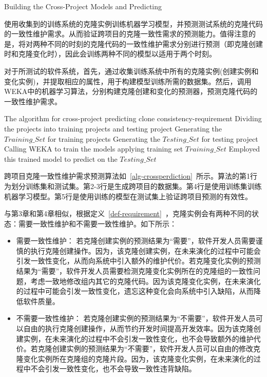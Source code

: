 {Building the Cross-Project Models and Predicting}

使用收集到的训练系统的克隆实例训练机器学习模型，并预测测试系统的克隆代码的一致性维护需求。从而验证跨项目的克隆一致性需求的预测能力。值得注意的是，将对两种不同的时刻的克隆代码的一致性维护需求分别进行预测（即克隆创建时和克隆变化时），因此会训练两种不同的模型以适用于两个时刻。

对于所测试的软件系统，首先，通过收集训练系统中所有的克隆实例(创建实例和变化实例)，并提取相应的属性，用于构建模型训练所需的数据集。然后，调用WEKA中的机器学习算法，分别构建克隆创建和变化的预测器，预测克隆代码的一致性维护需求。

\vspace{1em}
\begin{minipage}{0.8\textwidth}
\centering
\begin{algorithm}[H]
 {The algorithm for cross-project predicting clone consistency-requirement}
\label{alg-crossperdiction}
Dividing the projects into training projects and testing project\;
Generating the $Training\_{Set}$ for training projects\;
Generating the $Testing\_{Set}$ for testing project\;
Calling WEKA to train the models applying training set $Training\_{Set}$\;
Employed this trained model to predict on the $Testing\_{Set}$\;
\end{algorithm}
\end{minipage}
\vspace{1em}

跨项目克隆一致性维护需求预测算法如~\ref{alg-crossperdiction}~所示。算法的第1行为划分训练集和测试集。第2-3行是生成跨项目的数据集。第4行是使用训练集训练机器学习模型。第5行是使用训练的模型在测试集上验证跨项目预测的有效性。

与第3章和第4章相似，根据定义~\ref{def-requirement}~，克隆实例会有两种不同的状态：需要一致性维护和不需要一致性维护。如下所示：

\begin{itemize}
\item 
需要一致性维护：
若克隆创建实例的预测结果为“需要”，软件开发人员需要谨慎的执行克隆创建操作。因为，该克隆创建实例，在未来演化的过程中可能会引发一致性变化，从而向系统中引入额外的维护代价。若克隆变化实例的预测结果为“需要”，软件开发人员需要检测克隆变化实例所在的克隆组的一致性问题，考虑一致地修改组内其它的克隆代码。因为该克隆变化实例，在未来演化的过程中可能会引发一致性变化，遗忘这种变化会向系统中引入缺陷，从而降低软件质量。
\item
不需要一致性维护：
若克隆创建实例的预测结果为“不需要”，软件开发人员可以自由的执行克隆创建操作，从而节约开发时间提高开发效率。因为该克隆创建实例，在未来演化的过程中不会引发一致性变化，也不会导致额外的维护代价。若克隆创建实例的预测结果为“不需要”，软件开发人员可以自由的修改克隆变化实例所在克隆组的克隆片段。因为，该克隆变化实例，在未来演化的过程中不会引发一致性变化，也不会导致一致性违背缺陷。
\end{itemize}

